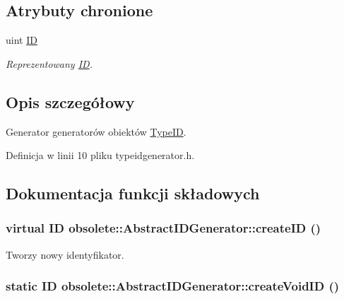\subsection*{Atrybuty chronione}
\begin{DoxyCompactItemize}
\item 
uint \hyperlink{classobsolete_1_1AbstractID_a5f67fa1c7d96085f0ef41193b60b570c}{ID}
\begin{DoxyCompactList}\small\item\em Reprezentowany \hyperlink{classobsolete_1_1ID}{ID}. \item\end{DoxyCompactList}\end{DoxyCompactItemize}


\subsection{Opis szczegółowy}
Generator generatorów obiektów \hyperlink{classobsolete_1_1TypeID}{TypeID}. 

Definicja w linii 10 pliku typeidgenerator.h.



\subsection{Dokumentacja funkcji składowych}
\hypertarget{classobsolete_1_1AbstractIDGenerator_a39d2f0147e3a028fef8299770e23db90}{
\subsubsection[{createID}]{\setlength{\rightskip}{0pt plus 5cm}virtual {\bf ID} obsolete::AbstractIDGenerator::createID ()}}
\label{classobsolete_1_1AbstractIDGenerator_a39d2f0147e3a028fef8299770e23db90}


Tworzy nowy identyfikator. 

\hypertarget{classobsolete_1_1AbstractIDGenerator_a330da88ba80820ca6ce0a29cbbab9e1b}{
\subsubsection[{createVoidID}]{\setlength{\rightskip}{0pt plus 5cm}static {\bf ID} obsolete::AbstractIDGenerator::createVoidID ()}}
\label{classobsolete_1_1AbstractIDGenerator_a330da88ba80820ca6ce0a29cbbab9e1b}


